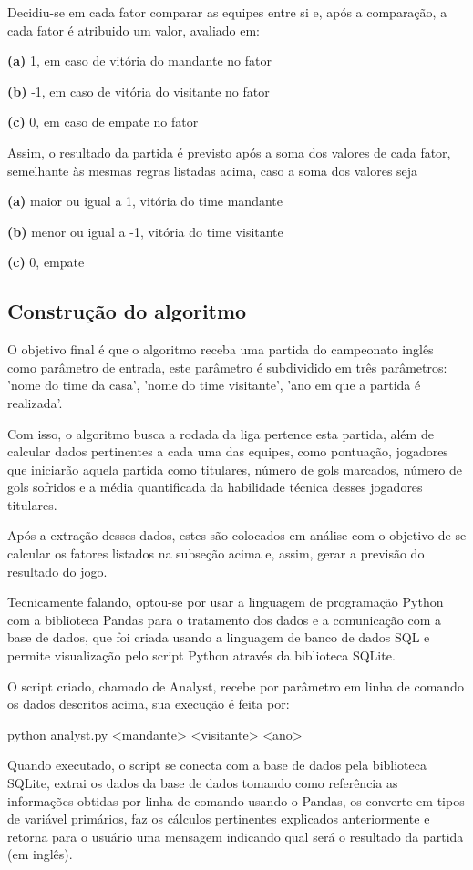 Decidiu-se em cada fator comparar as equipes entre si e, após a comparação, a cada fator é atribuido um valor, avaliado em:

\textbf{(a)} 1, em caso de vitória do mandante no fator

\textbf{(b)} -1, em caso de vitória do visitante no fator

\textbf{(c)} 0, em caso de empate no fator


Assim, o resultado da partida é previsto após a soma dos valores de cada fator, semelhante às mesmas regras listadas acima, caso a soma dos valores seja

\textbf{(a)} maior ou igual a 1, vitória do time mandante

\textbf{(b)} menor ou igual a -1, vitória do time visitante

\textbf{(c)} 0, empate

\subsection{Construção do algoritmo}
O objetivo final é que o algoritmo receba uma partida do campeonato inglês como parâmetro de entrada, este parâmetro é subdividido em três parâmetros: 'nome do time da casa', 'nome do time visitante', 'ano em que a partida é realizada'.

Com isso, o algoritmo busca a rodada da liga pertence esta partida, além de calcular dados pertinentes a cada uma das equipes, como pontuação, jogadores que iniciarão aquela partida como titulares, número de gols marcados, número de gols sofridos e a média quantificada da habilidade técnica desses jogadores titulares.

Após a extração desses dados, estes são colocados em análise com o objetivo de se calcular os fatores listados na subseção acima e, assim, gerar a previsão do resultado do jogo.

Tecnicamente falando, optou-se por usar a linguagem de programação Python com a biblioteca Pandas para o tratamento dos dados e a comunicação com a base de dados, que foi criada usando a linguagem de banco de dados SQL e permite visualização pelo script Python através da biblioteca SQLite.

O script criado, chamado de Analyst, recebe por parâmetro em linha de comando os dados descritos acima, sua execução é feita por:

{\tiny
	python analyst.py <mandante> <visitante> <ano>
}

Quando executado, o script se conecta com a base de dados pela biblioteca SQLite, extrai os dados da base de dados tomando como referência as informações obtidas por linha de comando usando o Pandas, os converte em tipos de variável primários, faz os cálculos pertinentes explicados anteriormente e retorna para o usuário uma mensagem indicando qual será o resultado da partida (em inglês). 

